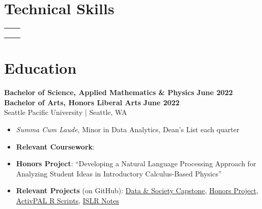 \documentclass{article}
\begin{document}
\maketitle




\section{Technical Skills}
    \begin{flushleft}
        \begin{tabular}{>{\raggedleft\arraybackslash}p{1.25in} >{\raggedright\arraybackslash}p{5.85in}}
             \\
             \\
             \\
             \\
            
        \end{tabular}
    \end{flushleft}




\section{Education}

    \textbf{Bachelor of Science, Applied Mathematics \& Physics} \hfill \textbf{June 2022}\\
    \textbf{Bachelor of Arts, Honors Liberal Arts} \hfill \textbf{June 2022}\\
    Seattle Pacific University | Seattle, WA 
    \squish
    \begin{itemize}
        \item 
        \textit{Summa Cum Laude}, Minor in Data Analytics, Dean's List each quarter
        \item 
        \textbf{Relevant Coursework}: 
        \item 
        \textbf{Honors Project}: ``Developing a Natural Language Processing Approach for Analyzing Student Ideas in Introductory Calculus-Based Physics''
        \item \textbf{Relevant Projects} (on GitHub): \href{https://github.com/jonmgeiger/household-conditions}{Data \& Society Capstone}, \href{https://github.com/jonmgeiger/honors-project}{Honors Project}, \href{https://github.com/jonmgeiger/activPAL/tree/main/scripts_jon}{ActivPAL R Scripts}, \href{https://github.com/jonmgeiger/islr-notes}{ISLR Notes}
    \end{itemize}
\end{document}
